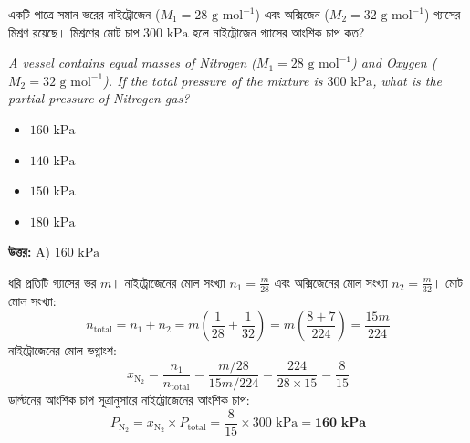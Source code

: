 \documentclass[12pt, a4paper]{article}
\begin{document}
\vspace{2em}

\begin{tcolorbox}[questionbox={প্রশ্ন (Question) 20}]
    \noindent
    একটি পাত্রে সমান ভরের নাইট্রোজেন ($M_1 = 28\text{ g mol}^{-1}$) এবং অক্সিজেন ($M_2 = 32\text{ g mol}^{-1}$) গ্যাসের মিশ্রণ রয়েছে। মিশ্রণের মোট চাপ $300\text{ kPa}$ হলে নাইট্রোজেন গ্যাসের আংশিক চাপ কত?
    
    \vspace{0.8em}
    \begin{english}
    \noindent\textit{\color{darkgray}
    A vessel contains equal masses of Nitrogen ($M_1 = 28\text{ g mol}^{-1}$) and Oxygen ($M_2 = 32\text{ g mol}^{-1}$). If the total pressure of the mixture is $300\text{ kPa}$, what is the partial pressure of Nitrogen gas?
    }
    \end{english}
\end{tcolorbox}

\begin{itemize}[label={}, leftmargin=1cm, itemsep=0.5em]
    \item[\textbf{A)}] $160\text{ kPa}$
    \item[\textbf{B)}] $140\text{ kPa}$
    \item[\textbf{C)}] $150\text{ kPa}$
    \item[\textbf{D)}] $180\text{ kPa}$
\end{itemize}

\vspace{0.5em}
\begin{tcolorbox}[answerbox]
    \textbf{\color{success} উত্তর:} A) $160\text{ kPa}$
\end{tcolorbox}
\vspace{1em}

\begin{tcolorbox}[solutionbox={সমাধান (Solution)}]
    \noindent
    ধরি প্রতিটি গ্যাসের ভর $m$। নাইট্রোজেনের মোল সংখ্যা $n_1 = \frac{m}{28}$ এবং অক্সিজেনের মোল সংখ্যা $n_2 = \frac{m}{32}$। মোট মোল সংখ্যা:
    \[ n_{\text{total}} = n_1 + n_2 = m \left(\frac{1}{28} + \frac{1}{32}\right) = m \left(\frac{8 + 7}{224}\right) = \frac{15 m}{224} \]
    নাইট্রোজেনের মোল ভগ্নাংশ:
    \[ x_{\text{N}_2} = \frac{n_1}{n_{\text{total}}} = \frac{m/28}{15m/224} = \frac{224}{28 \times 15} = \frac{8}{15} \]
    ডাল্টনের আংশিক চাপ সূত্রানুসারে নাইট্রোজেনের আংশিক চাপ:
    \[ P_{\text{N}_2} = x_{\text{N}_2} \times P_{\text{total}} = \frac{8}{15} \times 300\text{ kPa} = \mathbf{160\text{ kPa}} \]
\end{tcolorbox}
\end{document}
